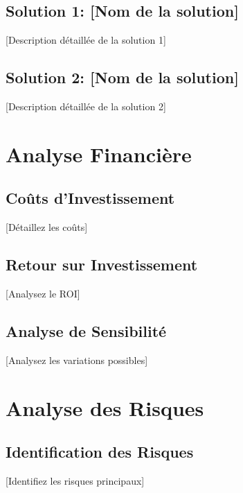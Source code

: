 \subsection{Solution 1: [Nom de la solution]}
[Description détaillée de la solution 1]

\examplecostbreakdown

\subsection{Solution 2: [Nom de la solution]}
[Description détaillée de la solution 2]


\section{Analyse Financière}

\subsection{Coûts d'Investissement}
[Détaillez les coûts]


\subsection{Retour sur Investissement}
[Analysez le ROI]

\exampleROI

\subsection{Analyse de Sensibilité}
[Analysez les variations possibles]

\section{Analyse des Risques}

\subsection{Identification des Risques}
[Identifiez les risques principaux]

\exampleriskmatrix

